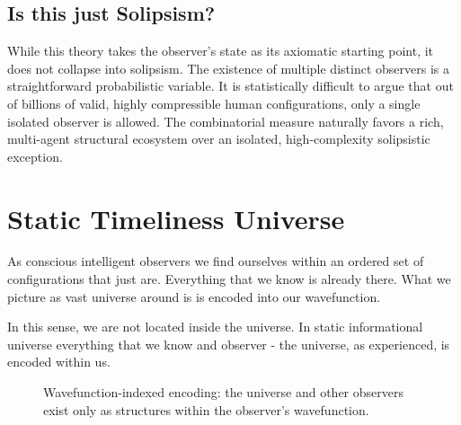 \subsection*{Is this just Solipsism?}

While this theory takes the observer's state as its axiomatic starting point, it does not collapse into solipsism.
The existence of multiple distinct observers is a straightforward probabilistic variable.
It is statistically difficult to argue that out of billions of valid, highly compressible human configurations, only a single isolated observer is allowed.
The combinatorial measure naturally favors a rich, multi-agent structural ecosystem over an isolated, high-complexity solipsistic exception.

\section{Static Timeliness Universe}

As conscious intelligent observers we find ourselves within an ordered set of configurations that just are. Everything
that we know is already there. What we picture as vast universe around is is encoded into our wavefunction.

In this sense, we are not located inside the universe.
In static informational universe everything that we know and observer - the universe, as experienced, is encoded within us. 

\begin{figure}[h]
    \centering
    \caption{Wavefunction-indexed encoding: the universe and other observers exist only as structures within the observer’s wavefunction.}
\end{figure}

